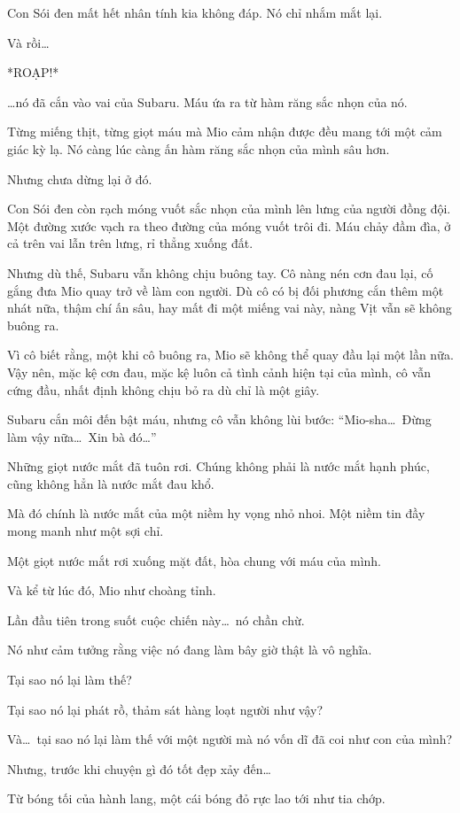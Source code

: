\documentclass[../main.tex]{subfiles}
\begin{document}
Con Sói đen mất hết nhân tính kia không đáp. Nó chỉ nhắm mắt lại.

Và rồi\dots

*ROẠP!*

\dots nó đã cắn vào vai của Subaru. Máu ứa ra từ hàm răng sắc nhọn của nó.

Từng miếng thịt, từng giọt máu mà Mio cảm nhận được đều mang tới một cảm giác kỳ lạ. Nó càng lúc càng ấn hàm răng sắc nhọn của mình sâu hơn.

Nhưng chưa dừng lại ở đó.

Con Sói đen còn rạch móng vuốt sắc nhọn của mình lên lưng của người đồng đội. Một đường xước vạch ra theo đường của móng vuốt trôi đi. Máu chảy đầm đìa, ở cả trên vai lẫn trên lưng, rỉ thẳng xuống đất.

Nhưng dù thế, Subaru vẫn không chịu buông tay. Cô nàng nén cơn đau lại, cố gắng đưa Mio quay trở về làm con người. Dù cô có bị đối phương cắn thêm một nhát nữa, thậm chí ấn sâu, hay mất đi một miếng vai này, nàng Vịt vẫn sẽ không buông ra.

Vì cô biết rằng, một khi cô buông ra, Mio sẽ không thể quay đầu lại một lần nữa. Vậy nên, mặc kệ cơn đau, mặc kệ luôn cả tình cảnh hiện tại của mình, cô vẫn cứng đầu, nhất định không chịu bỏ ra dù chỉ là một giây.

Subaru cắn môi đến bật máu, nhưng cô vẫn không lùi bước: ``Mio-sha\dots\ Đừng làm vậy nữa\dots\ Xin bà đó\dots''

Những giọt nước mắt đã tuôn rơi. Chúng không phải là nước mắt hạnh phúc, cũng không hẳn là nước mắt đau khổ.

Mà đó chính là nước mắt của một niềm hy vọng nhỏ nhoi. Một niềm tin đầy mong manh như một sợi chỉ.

Một giọt nước mắt rơi xuống mặt đất, hòa chung với máu của mình.

Và kể từ lúc đó, Mio như choàng tỉnh.

Lần đầu tiên trong suốt cuộc chiến này\dots\ nó chần chừ.

Nó như cảm tưởng rằng việc nó đang làm bây giờ thật là vô nghĩa.

Tại sao nó lại làm thế?

Tại sao nó lại phát rồ, thảm sát hàng loạt người như vậy?

Và\dots\ tại sao nó lại làm thế với một người mà nó vốn dĩ đã coi như con của mình?

Nhưng, trước khi chuyện gì đó tốt đẹp xảy đến\dots

Từ bóng tối của hành lang, một cái bóng đỏ rực lao tới như tia chớp.
\end{document}
